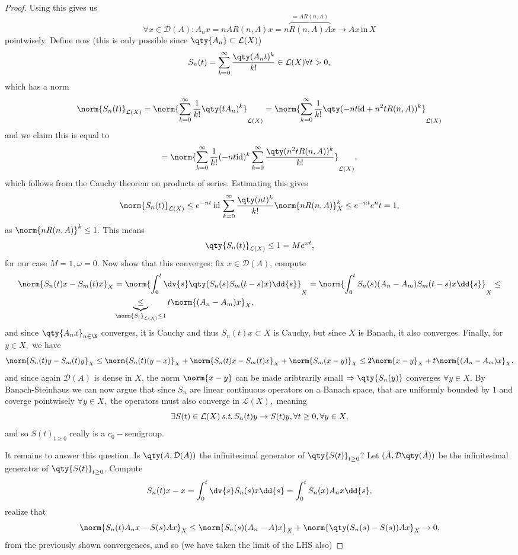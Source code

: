 \begin{proof}
Using this gives us
\[
	\forall x \in \mathcal{D}(A): A_n x = n AR(n,A)x = n \overbrace{R(n,A)A}^{=AR(n,A)}x \to Ax \, \text{in} \,X
\]
pointwisely. Define now (this is only possible since $\qty{A_n} \subset \mathcal{L}(X)$)
\[
	S_n(t) = \sum_{k=0}^{\infty}\frac{\qty(A_n t)^k}{k!} \in \mathcal{L}(X) \forall t>0,
\]
which has a norm
\[
	\norm{S_n(t)}_{\mathcal{L}(X)} = \norm{\sum_{k=0}^{\infty}\frac{1}{k!}\qty(tA_n)^k}_{\mathcal{L}(X)} = \norm{\sum_{k=0}^{\infty} \frac{1}{k!}\qty(-n t \text{id} + n^{2} t R(n,A))^k}_{\mathcal{L}(X)}
\]
and we claim this is equal to
\[
	= \norm{\sum_{k=0}^{\infty}\frac{1}{k!}(-n t \text{id})^k \sum_{k=0}^\infty \frac{\qty(n^{2} t R(n,A))^k}{k!}}_{\mathcal{L}(X)},
\]
which follows from the Cauchy theorem on products of series. Estimating this gives
\[
	\norm{S_n(t)}_{\mathcal{L}(X)}\leq e^{-nt}\, \text{id} \, \sum_{k=0}^{\infty}\frac{\qty(nt)^k}{k!}\norm{nR(n,A)}^k_X \leq e^{-nt} e^nt = 1,
\]
as $\norm{nR(n,A)}^k \leq 1.$ This means
\[
	\qty{S_n(t)}_{\mathcal{L}(X)} \leq 1 = Me^{\omega t},
\]
for our case $M=1, \omega = 0.$
Now show that this converges: fix $x \in \mathcal{D}(A)$, compute
\begin{align*}
	\norm{S_n(t)x - S_m(t)x}_X &= \norm{\int_0^t \dv{s} \qty(S_n(s) S_m(t-s)x)\dd{s}}_X = \norm{\int_0^t S_n(s)(A_n - A_m)S_m(t-s)x \dd{s}}_X \leq \\
				   &\underbrace{\leq}_{\norm{S_l}_{\mathcal{L}(X)}\leq 1} t\norm{(A_n - A_m)x}_X, 
\end{align*}
and since $\qty{A_n x}_{n \in \N}$ converges, it is Cauchy and thus ${S_n(t)x} \subset X$ is Cauchy, but since $X$ is Banach, it also converges. Finally, for $y \in X,$ we have
\[
	\norm{S_n(t)y - S_m(t)y}_X \leq \norm{S_n(t)(y-x)}_X + \norm{S_n(t)x - S_m(t)x}_X + \norm{S_m(x-y)}_X \leq 2 \norm{x-y}_X + t\norm{(A_n - A_m)x}_X,
\]
and since again $\mathcal{D}(A)$ is dense in $X$, the norm $\norm{x-y}$ can be made aribtrarily small $\Rightarrow \qty{S_n(y)}$ converges $\forall y \in X.$ By Banach-Steinhaus we can now argue that since $S_n$ are linear continuous operators on a Banach space, that are uniformly bounded by $1$ and coverge pointwisely $\forall y \in X,$ the operators must also converge in $\mathcal{L}(X),$ meaning
\[
	\exists S(t) \in \mathcal{L}(X) \, \text{\textit{s.t.}} \, S_n(t)y \to S(t)y, \forall t \geq 0, \forall y \in X,
\]
and so ${S(t)}_{t \geq 0}$ really is a $c_0-$semigroup.

It remains to answer this question. Is $\qty(A, \mathcal{D}(A))$ the infinitesimal generator of $\qty{S(t)}_{t\geq 0}$? Let $(\tilde{A}, \mathcal{D}\qty(\tilde{A}))$ be the infinitesimal generator of $\qty{S(t)}_{t\geq 0}$. Compute
\[
	S_n(t)x - x = \int_0^t \dv{s} S_n(s) x \dd{s} = \int_0^t S_n(x)A_n x \dd{s},
\]
realize that
\[
	\norm{S_n(t) A_n x - S(s) A x}_X \leq \norm{S_n(s)(A_n - A)x}_X + \norm{\qty(S_n(s)-S(s))Ax}_X \to 0,
\]
from the previously shown convergences, and so (we have taken the limit of the LHS also)


\end{proof}
